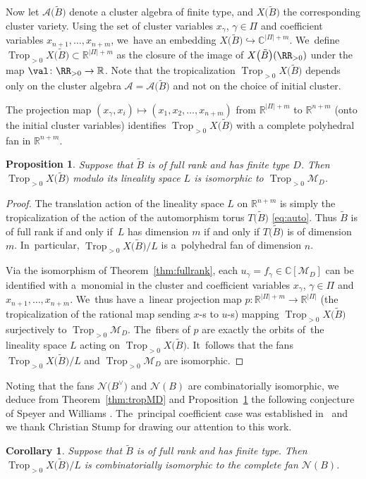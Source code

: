 \documentclass[10pt,a4paper]{amsart}
\def\R{{\mathbb R}}
\def\C{{\mathbb C}}
\def\A{{\mathcal{A}}}
\def\tB{{\tilde B}}
\def\M{{\mathcal{M}}}
\def\tB{{\tilde B}}
\def\N{{\mathcal{N}}}
\def\Trop{\operatorname{Trop}}
\numberwithin{equation}{section}
\newtheorem{Corollary}[Theorem]{Corollary}
\newtheorem{Proposition}[Theorem]{Proposition}
\begin{document}
Now let $\A\big(\tB\big)$ denote a cluster algebra of finite type, and $X\big(\tB\big)$ the corresponding cluster variety. Using the set of cluster variables $x_\gamma$, $\gamma \in \Pi$ and coefficient variables $x_{n+1},\dots,x_{n+m}$, we~have an embedding $X\big(\tB\big) \hookrightarrow \C^{|\Pi|+m}$. We~define $\Trop_{>0}X\big(\tB\big) \subset \R^{|\Pi|+m}$ as the closure of the image of $X\big(\tB\big)(\RR_{>0})$ under the map $\val\colon \RR_{>0} \to \R$. Note that the tropicalization $\Trop_{>0}X\big(\tB\big)$ depends only on the cluster algebra $\A = \A\big(\tB\big)$ and not on the choice of initial cluster.

The projection map $(x_\gamma,x_i) \mapsto (x_1,x_2,\dots,x_{n+m})$ from $\R^{|\Pi|+m}$ to $\R^{n+m}$ (onto the initial cluster variables) identifies $\Trop_{>0}X\big(\tB\big)$ with a complete polyhedral fan in $\R^{n+m}$.

\begin{Proposition}\label{prop:modL}
Suppose that $\tB$ is of full rank and has finite type $D$. Then $\Trop_{>0} X\big(\tB\big)$ modulo its lineality space $L$ is isomorphic to $\Trop_{>0}\M_D$.
\end{Proposition}
\begin{proof}
The translation action of the lineality space $L$ on $\R^{n+m}$ is simply the tropicalization of the action of the automorphism torus $T\big(\tB\big)$ \eqref{eq:auto}. Thus $\tB$ is of full rank if and only if~$L$ has dimension $m$ if and only if $T\big(\tB\big)$ is of dimension $m$. In~particular, $\Trop_{>0}X\big(\tB\big)/L$ is a~polyhedral fan of dimension $n$.

Via the isomorphism of Theorem~\ref{thm:fullrank}, each $u_\gamma = f_\gamma \in \C[\M_D]$ can be identified with a~monomial in the cluster and coefficient variables $x_\gamma$, $\gamma \in \Pi$ and $x_{n+1},\dots,x_{n+m}$. We~thus have a~linear projection map $p\colon \R^{|\Pi|+m} \to \R^{|\Pi|}$ (the tropicalization of the rational map sending $x$-s to $u$-s) mapping $\Trop_{>0} X\big(\tB\big)$ surjectively to $\Trop_{>0} \M_D$. The~fibers of $p$ are exactly the orbits of~the lineality space $L$ acting on $\Trop_{>0} X\big(\tB\big)$. It~follows that the fans $\Trop_{>0}X\big(\tB\big)/L$ and $\Trop_{>0} \M_D$ are isomorphic.
\end{proof}

Noting that the fans $\N\big(B^\vee\big)$ and $\N(B)$ are combinatorially isomorphic, we deduce from Theorem~\ref{thm:tropMD} and Proposition~\ref{prop:modL} the following conjecture of Speyer and Williams \cite[Conjecture~8.1]{SW}. The~principal coefficient case was established in~\cite{JLS} and we thank Christian Stump for drawing our attention to this work.
\begin{Corollary}
Suppose that $\tB$ is of full rank and has finite type. Then $\Trop_{>0}X\big(\tB\big)/L$ is combinatorially isomorphic to the complete fan $\N(B)$.
\end{Corollary}
\end{document}
